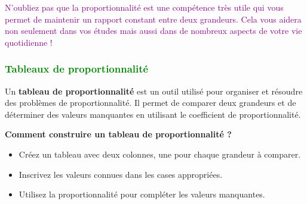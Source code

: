 \documentclass{article}
\begin{document}
\vspace{0.2cm}

\textcolor{purple}{N'oubliez pas que la proportionnalité est une compétence très utile qui vous permet de maintenir un rapport constant entre deux grandeurs. Cela vous aidera non seulement dans vos études mais aussi dans de nombreux aspects de votre vie quotidienne !}

\subsubsection{\textcolor{green}{Tableaux de proportionnalité}}

\vspace{0.2cm}

\begin{tcolorbox}[colback=blue!10!white, colframe=red!75!black, title=\textcolor{white}{Définition}, 
                  sharp corners=south]
    Un \textbf{tableau de proportionnalité} est un outil utilisé pour organiser et résoudre des problèmes de proportionnalité. Il permet de comparer deux grandeurs et de déterminer des valeurs manquantes en utilisant le coefficient de proportionnalité.
\end{tcolorbox}

\vspace{0.2cm}

\textbf{Comment construire un tableau de proportionnalité ?}
\begin{itemize}
    \item Créez un tableau avec deux colonnes, une pour chaque grandeur à comparer.
    \item Inscrivez les valeurs connues dans les cases appropriées.
    \item Utilisez la proportionnalité pour compléter les valeurs manquantes.
\end{itemize}

\vspace{0.2cm}
\end{document}
